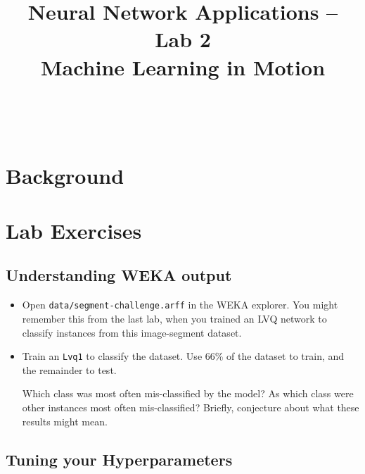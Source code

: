 \documentclass[11pt]{cselabheader}
\title{Neural Network Applications -- Lab 2 \\ Machine Learning in Motion}
\begin{document}
\maketitle

\horrule{0.5pt}\\\horrule{2pt}

\section{Background}

\pagebreak

\section{Lab Exercises}

\subsection{Understanding WEKA output}

\begin{itemize}[leftmargin=*]
  \item Open \texttt{data/segment-challenge.arff} in the WEKA explorer. You might remember this from the last lab, when you trained an LVQ network to classify instances from this image-segment dataset.

  \item Train an \texttt{Lvq1} to classify the dataset. Use 66\% of the dataset to train, and the remainder to test.

  \begin{ex}
    Which class was most often mis-classified by the model? As which class were other instances most often mis-classified? Briefly, conjecture about what these results might mean.
  \end{ex}
\end{itemize}

\subsection{Tuning your Hyperparameters}
\end{document}
